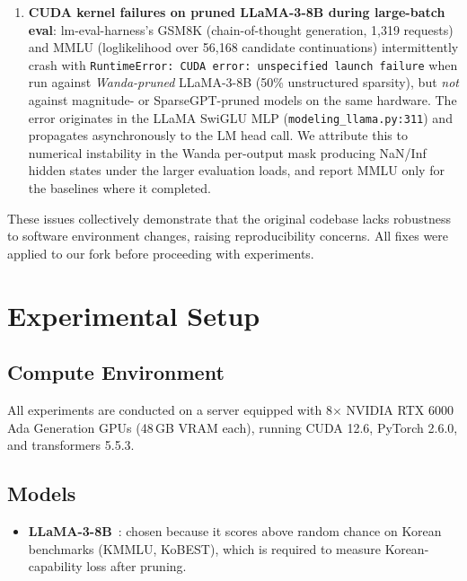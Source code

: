\documentclass{article}
\begin{document}
\begin{enumerate}
  \item \textbf{CUDA kernel failures on pruned LLaMA-3-8B during
        large-batch eval}: lm-eval-harness's GSM8K (chain-of-thought
        generation, 1{,}319 requests) and MMLU (loglikelihood over
        56{,}168 candidate continuations) intermittently crash with
        \texttt{RuntimeError: CUDA error: unspecified launch failure}
        when run against \emph{Wanda-pruned} LLaMA-3-8B (50\% unstructured
        sparsity), but \emph{not} against magnitude- or SparseGPT-pruned
        models on the same hardware. The error originates in the
        LLaMA SwiGLU MLP (\texttt{modeling\_llama.py:311}) and propagates
        asynchronously to the LM head call. We attribute this to
        numerical instability in the Wanda per-output mask producing
        NaN/Inf hidden states under the larger evaluation loads, and
        report MMLU only for the baselines where it completed.
\end{enumerate}

These issues collectively demonstrate that the original codebase lacks
robustness to software environment changes, raising reproducibility concerns.
All fixes were applied to our fork before proceeding with experiments.

\section{Experimental Setup}

\subsection{Compute Environment}

All experiments are conducted on a server equipped with
8$\times$ NVIDIA RTX 6000 Ada Generation GPUs (48\,GB VRAM each),
running CUDA 12.6, PyTorch 2.6.0, and transformers 5.5.3.

\subsection{Models}

\begin{itemize}
  \item \textbf{LLaMA-3-8B}~\cite{llama}: chosen because it scores above
        random chance on Korean benchmarks (KMMLU, KoBEST), which is
        required to measure Korean-capability loss after pruning.
\end{itemize}
\end{document}
